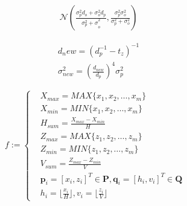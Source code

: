 \documentclass{article}
\begin{document}
\begin{CJK*}{GBK}{song}
\begin{equation}\left.\begin{aligned}
  &\mathcal{N}(\frac{{\sigma}^{2}_{p}{d}_{o}+{\sigma}^{2}_{o}{d}_{p}}{{{\sigma}^{2}_{p}+\sigma}^{2}_{o}},\frac{{\sigma}^{2}_{p}{\sigma}^{2}_{o}}{{\sigma}^{2}_{p}+{\sigma}^{2}_{o}})
\end{aligned}\tag{2.14}\right.\end{equation}

\begin{equation}\left.\begin{aligned}
  &d_new=(d_p^{-1}-t_z)^{-1}
  \\&
  \sigma_{new}^{2}=\left(\frac{d_{new}}{d_p}\right)^4\sigma_{p}^2
\end{aligned}\tag{2.14}\right.\end{equation}

\begin{equation}f:=\left\{\begin{aligned}
  &
  X_{max}=MAX\{x_1,x_2,\ldots,x_m\}
  \\&
 X_{min}=MIN\{x_1,x_2,\ldots,x_m \}
  \\&
  H_{sum} = \frac{X_{max}-X_{min}}{H}
  \\&
  Z_{max}=MAX\{z_1,z_2,\ldots,z_m\}
  \\&
  Z_{min}=MIN\{z_1,z_2,\ldots,z_m\}
  \\&
  V_{sum} = \frac{Z_{max}-Z_{min}}{V}
  \\&
  \boldsymbol{p}_i = [x_i,z_i ]^T \in{\boldsymbol{P}},\boldsymbol{q}_i = [h_i,v_i ]^T\in{\boldsymbol{Q}}
  \\&
  h_i=\Big\lfloor\frac{x_i}{H}\Big\rfloor,v_i=\Big\lfloor\frac{z_i}{V}\Big\rfloor
  \end{aligned}\tag{3.2}\right.\end{equation}



\end{CJK*}
\end{document}
